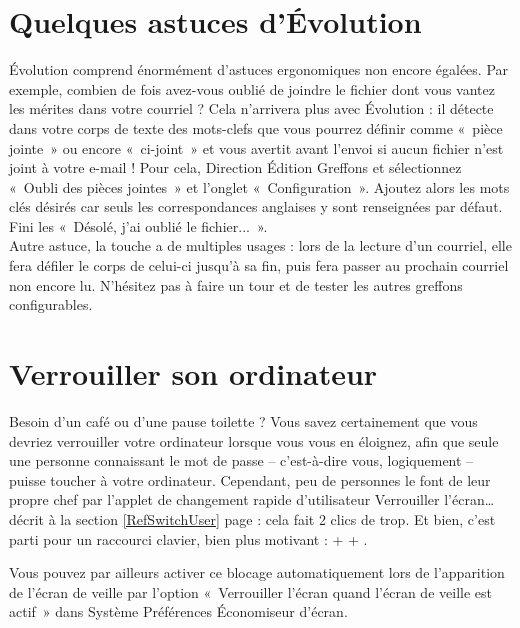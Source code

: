 \section{Quelques astuces d'Évolution}
Évolution comprend énormément d'astuces ergonomiques non encore égalées. Par exemple, combien de fois avez-vous oublié de joindre le fichier dont vous vantez les mérites dans votre courriel ? Cela n'arrivera plus avec Évolution : il détecte dans votre corps de texte des mots-clefs que vous pourrez définir comme «~pièce jointe~» ou encore «~ci-joint~» et vous avertit avant l'envoi si aucun fichier n'est joint à votre e-mail ! Pour cela, Direction Édition \FlecheDroite Greffons et sélectionnez «~Oubli des pièces jointes~» et l'onglet «~Configuration~». Ajoutez alors les mots clés désirés car seuls les correspondances anglaises y sont renseignées par défaut. Fini les «~Désolé, j'ai oublié le fichier...~».\\
Autre astuce, la touche  a de multiples usages : lors de la lecture d'un courriel, elle fera défiler le corps de celui-ci jusqu'à sa fin, puis fera passer au prochain courriel non encore lu. N'hésitez pas à faire un tour et de tester les autres greffons configurables.
\section{Verrouiller son ordinateur}
\label{RefVerrouillageOrdi}
Besoin d'un café ou d'une pause toilette ? Vous savez certainement que vous devriez verrouiller votre ordinateur lorsque vous vous en éloignez, afin que seule une personne connaissant le mot de passe -- c'est-à-dire vous, logiquement -- puisse toucher à votre ordinateur. Cependant, peu de personnes le font de leur propre chef par l'applet de changement rapide d'utilisateur \FlecheDroite Verrouiller l'écran\ldots{} décrit à la section \ref{RefSwitchUser} page \pageref{RefSwitchUser} : cela fait 2 clics de trop. Et bien, c'est parti pour un raccourci clavier, bien plus motivant :  +  + .\par
Vous pouvez par ailleurs activer ce blocage automatiquement lors de l'apparition de l'écran de veille par l'option «~Verrouiller l'écran quand l'écran de veille est actif~» dans Système \FlecheDroite Préférences \FlecheDroite Économiseur d'écran.
